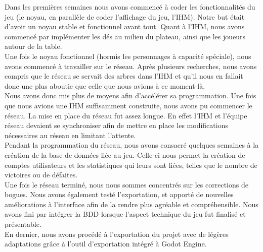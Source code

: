 \documentclass[a4paper,11pt]{article}
\begin{document}
    Dans les premières semaines nous avons commencé à coder les fonctionnalités du jeu (le noyau, en parallèle de coder l’affichage du jeu, l’IHM). Notre but était d’avoir un noyau stable et fonctionnel avant tout. Quant à l’IHM, nous avons commencé par implémenter les dés au milieu du plateau, ainsi que les joueurs autour de la table. \\

	Une fois le noyau fonctionnel (hormis les personnages à capacité spéciale), nous avons commencé à travailler sur le réseau. Après plusieurs recherches, nous avons compris que le réseau se servait des arbres dans l’IHM et qu’il nous en fallait donc une plus aboutie que celle que nous avions à ce moment-là. \\

    Nous avons donc mis plus de moyens afin d’accélérer sa programmation. Une fois que nous avions une IHM suffisamment construite, nous avons pu commencer le réseau. La mise en place du réseau fut assez longue. En effet l’IHM et l’équipe réseau devaient se synchroniser afin de mettre en place les modifications nécessaires au réseau en limitant l’attente. \\

    Pendant la programmation du réseau, nous avons consacré quelques semaines à la création de la base de données liée au jeu. Celle-ci nous permet la création de comptes utilisateurs et les statistiques qui leurs sont liées, telles que le nombre de victoires ou de défaites. \\

	Une fois le réseau terminé, nous nous sommes concentrés sur les corrections de bogues. Nous avons également testé l’exportation, et apporté de nouvelles améliorations  à l’interface afin de la rendre plus agréable et compréhensible. Nous avons fini par intégrer la BDD lorsque l’aspect technique du jeu fut finalisé et présentable. \\ 

    En dernier, nous avons procédé à l’exportation du projet avec de légères adaptations grâce à l’outil d'exportation intégré à Godot Engine.
\end{document}
